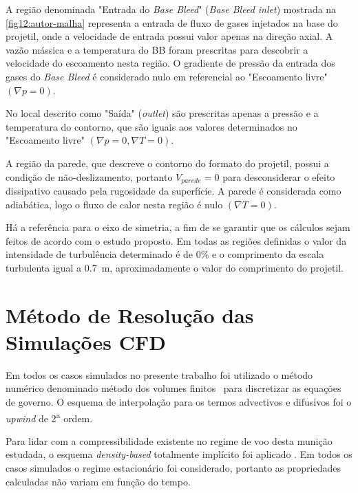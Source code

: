 A região denominada "Entrada do \textit{Base Bleed}"{} (\textit{Base Bleed inlet}) mostrada na \autoref{fig12:autor-malha} representa a entrada de fluxo de gases injetados na base do projetil, onde a velocidade de entrada possui valor apenas na direção axial. A vazão mássica e a temperatura do BB foram prescritas para descobrir a velocidade do escoamento nesta região. O gradiente de pressão da entrada dos gases do \textit{Base Bleed} é considerado nulo em referencial ao "Escoamento livre"{} \(\left(\nabla p = 0\right)\).

No local descrito como "Saída"{} (\textit{outlet}) são prescritas apenas a pressão e a temperatura do contorno, que são iguais aos valores determinados no "Escoamento livre"{} \(\left(\nabla p = 0, \nabla T = 0\right)\).

A região da parede, que descreve o contorno do formato do projetil, possui a condição de não-deslizamento, portanto \(V_{parede} = 0\) para desconsiderar o efeito dissipativo causado pela rugosidade da superfície. A parede é considerada como adiabática, logo o fluxo de calor nesta região é nulo \(\left(\nabla T = 0\right)\).

Há a referência para o eixo de simetria, a fim de se garantir que os cálculos sejam feitos de acordo com o estudo proposto. Em todas as regiões definidas o valor da intensidade de turbulência determinado é de 0\% e o comprimento da escala turbulenta igual a \qty{0,7}{\metre}, aproximadamente o valor do comprimento do projetil.

\section{Método de Resolução das Simulações CFD}\label{sec:metodo-resolucao-cfd}

Em todos os casos simulados no presente trabalho foi utilizado o método numérico denominado método dos volumes finitos~\cite{McDonald1971,MacComarck&Paulay1972} para discretizar as equações de governo. O esquema de interpolação para os termos advectivos e difusivos foi o \textit{upwind} de 2\textsuperscript{a} ordem. 

Para lidar com a compressibilidade existente no regime de voo desta munição estudada, o esquema \textit{density-based} totalmente implícito foi aplicado \cite{Weiss1995PreconditioningAT,Weiss1997IMPLICITSO,Weiss1999ImplicitSO}. Em todos os casos simulados o regime estacionário foi considerado, portanto as propriedades calculadas não variam em função do tempo. 


